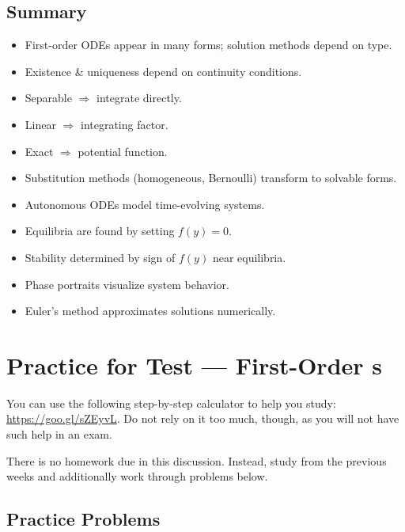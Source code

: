\subsection*{Summary}
\begin{itemize}
    \item First-order ODEs appear in many forms; solution methods depend on type.
    \item Existence \& uniqueness depend on continuity conditions.
    \item Separable $\Rightarrow$ integrate directly.
    \item Linear $\Rightarrow$ integrating factor.
    \item Exact $\Rightarrow$ potential function.
    \item Substitution methods (homogeneous, Bernoulli) transform to solvable forms.
    \item Autonomous ODEs model time-evolving systems.
    \item Equilibria are found by setting \(f(y) = 0\).
    \item Stability determined by sign of \(f(y)\) near equilibria.
    \item Phase portraits visualize system behavior.
    \item Euler's method approximates solutions numerically.
\end{itemize}





\section{Practice for Test --- First-Order \ode{}s}

You can use the following step-by-step calculator to help you study: \url{https://goo.gl/sZEyvL}. Do not rely on it too much, though, as you will not have such help in an exam.

There is no homework due in this discussion. Instead, study from the previous weeks and additionally work through problems below.

\subsection*{Practice Problems}

